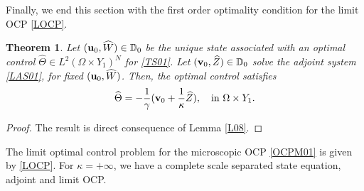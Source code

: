 \documentclass[11pt,a4paper]{article}
\numberwithin{equation}{section}
\def\O{\Omega}
\def\d{\delta}
\def\e{\varepsilon}
\def\D{{\mathbb{D}}}
\def\W{{\mathbb{W}}}
\def\Mc{{\mathcal{M}}}
\def\ed{{\varepsilon\delta}}
\def\wh{\widehat }
\def\wt{\widetilde }
\def\X{\times }
\def\Gj{{\bf j}}
\def\Gu{{\bf u}}
\def\Gv{{\bf v}}
\def\GJ{{\bf J}}
\newtheorem{theorem}{Theorem}[section]
\newtheorem{remark}{Remark}
\begin{document}
	Finally, we end this section with the first order optimality condition for the limit OCP \eqref{LOCP}.
	\begin{theorem}
		Let $(\Gu_0,\wh W)\in\D_0$ be the unique state associated with an optimal control $\wh \Theta\in L^2(\O\X Y_1)^N$ for \eqref{TS01}. Let $(\Gv_0,\wh Z)\in\D_0$ solve the adjoint system \eqref{LAS01}, for fixed $(\Gu_0,\wh W)$. Then, the optimal control satisfies
		\begin{equation}
			\wh \Theta=-{1\over \gamma}(\Gv_0+{1\over \kappa}\wh Z),\quad \text{in $\O\X Y_1$}.
		\end{equation}
	\end{theorem}
	\begin{proof}
		The result is direct consequence of Lemma \ref{L08}.
	\end{proof}
		The limit optimal control problem for the microscopic OCP \eqref{OCPM01} is given by \eqref{LOCP}. For $\kappa=+\infty$, we have a complete scale separated state equation, adjoint and limit OCP. 

%		
%

				
				
				
\end{document}
